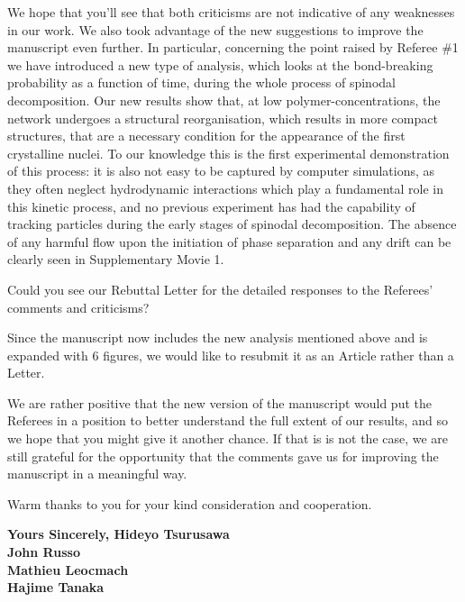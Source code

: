\documentclass[11pt,a4paper]{article}
\begin{document}
We hope that you'll see that both criticisms are not indicative of any weaknesses in our work. We also took advantage of the new suggestions to improve the manuscript even further. In particular, concerning the point raised by Referee \#1 we have introduced a new type of analysis, which looks at the bond-breaking probability as a function of time, during the whole process of spinodal decomposition. Our new results show that, at low polymer-concentrations, the network undergoes a structural reorganisation, which results in more compact structures, that are a necessary condition for the appearance of the first crystalline nuclei. To our knowledge this is the first experimental demonstration of this process: it is also not easy to be captured by computer simulations, as they often neglect hydrodynamic interactions which play a fundamental role in this kinetic process, and no previous experiment has had the capability of tracking particles during the early stages of spinodal decomposition. The absence of any harmful flow upon the initiation of phase separation and any drift can be clearly seen in Supplementary Movie 1.  

\vskip 0.3cm

Could you see our Rebuttal Letter for the detailed responses to the Referees' comments and criticisms?

\vskip 0.3cm

Since the manuscript now includes the new analysis mentioned above and is expanded with 6 figures, we would like to resubmit it as an Article rather than a Letter. 
\textit{
\vskip 0.3cm}

We are rather positive that the new version of the manuscript would put the Referees in a position to better understand the full extent of our results, and
so we hope that you might give it another chance. If that is is not the case, we are still grateful for the opportunity that the comments gave us for improving the manuscript in a meaningful way.

\vskip 0.5cm

Warm thanks to you for your kind consideration and cooperation. 

\vskip 0.8cm

\noindent
{\bf Yours Sincerely,
\vskip 0.3cm
\indent Hideyo Tsurusawa\\
\indent John Russo\\
\indent Mathieu Leocmach\\
\indent Hajime Tanaka}
\end{document}

